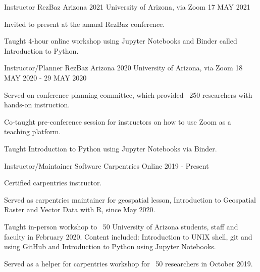 


\begin{cventries}

\cventry
{Instructor} %
{RezBaz Arizona 2021} %
{University of Arizona, via Zoom} %
{17 MAY 2021} %
{ %
\begin{cvitems}
\item {Invited to present at the annual RezBaz conference.}
\item {Taught 4-hour online workshop using Jupyter Notebooks and Binder called Introduction to Python.}
\end{cvitems}
}

\cventry
{Instructor/Planner} %
{RezBaz Arizona 2020} %
{University of Arizona, via Zoom} %
{18 MAY 2020 - 29 MAY 2020} %
{ %
\begin{cvitems}
\item {Served on conference planning committee, which provided ~250 researchers with hands-on instruction.}
\item {Co-taught pre-conference session for instructors on how to use Zoom as a teaching platform.}
\item {Taught Introduction to Python using Jupyter Notebooks via Binder.}
\end{cvitems}
}

\cventry
{Instructor/Maintainer} %
{Software Carpentries} %
{Online} %
{2019 - Present} %
{ %
\begin{cvitems}
\item {Certified carpentries instructor.}
\item {Served as carpentries maintainer for geospatial lesson, Introduction to Geospatial Raster and Vector Data with R, since May 2020.}
\item {Taught in-person workshop to ~50 University of Arizona students, staff and faculty in February 2020. Content included: Introduction to UNIX shell, git and using GitHub and Introduction to Python using Jupyter Notebooks.}
\item {Served as a helper for carpentries workshop for ~50 researchers in October 2019.}
\end{cvitems}
}


\end{cventries}
